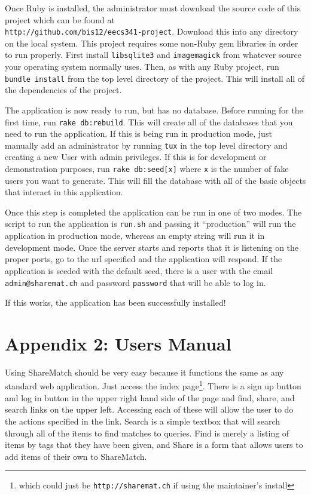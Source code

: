 \documentclass{acm_proc_article-sp}
\begin{document}
Once Ruby is installed, the administrator must download the source code of this project which can be found at \\\texttt{http://github.com/bis12/eecs341-project}.  Download this into any directory on the local system.  This project requires some non-Ruby gem libraries in order to run properly.  First install \texttt{libsqlite3} and \texttt{imagemagick} from whatever source your operating system normally uses. Then, as with any Ruby project, run \texttt{bundle install} from the top level directory of the project. This will install all of the dependencies of the project.

The application is now ready to run, but has no database.  Before running for the first time,  run \texttt{rake db:rebuild}. This will create all of the databases that you need to run the application.  If this is being run in production mode, just manually add an administrator by running \texttt{tux} in the top level directory and creating a new User with admin privileges.  If this is for development or demonstration purposes, run \texttt{rake db:seed[x]} where \texttt{x} is the number of fake users you want to generate.  This will fill the database with all of the basic objects that interact in this application.  

Once this step is completed the application can be run in one of two modes.  The script to run the application is \texttt{run.sh} and passing it ``production'' will run the application in production mode, whereas an empty string will run it in development mode. Once the server starts and reports that it is listening on the proper ports, go to the url specified and the application will respond.  If the application is seeded with the default seed, there is a user with the email \texttt{admin@sharemat.ch} and password \texttt{password} that will be able to log in.

If this works, the application has been successfully installed!
\section{Appendix 2: Users Manual}
Using ShareMatch should be very easy because it functions the same as any standard web application.  Just access the index page\footnote{which could just be \texttt{http://sharemat.ch} if using the maintainer's install}.  There is a sign up button and log in button in the upper right hand side of the page and find, share, and search links on the upper left. Accessing each of these will allow the user to do the actions specified in the link.  Search is a simple textbox that will search through all of the items to find matches to queries.  Find is merely a listing of items by tags that they have been given, and Share is a form that allows users to add items of their own to ShareMatch.
\end{document}
